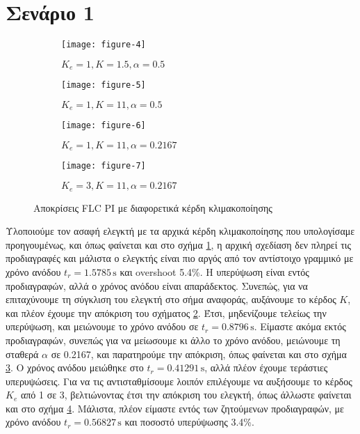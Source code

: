 \documentclass[11pt,a4paper,titlepage, oneside]{article}
\newlength\figureheight
\begin{document}
  	\section{Σενάριο 1}
	\begin{wrapfigure}{r}{0.5\textwidth}
		\setlength\figureheight{2.67cm}
		\vspace{-30pt}
		\centering
		\begin{subfigure}[t]{0.5\textwidth}
			\centering
			\texttt{[image: figure-4]}
			\caption{$K_e = 1, K = 1.5, \alpha = 0.5$}
			\label{fig:flcpi_responses_a}
		\end{subfigure}
		\begin{subfigure}[t]{0.5\textwidth}
			\centering
			\texttt{[image: figure-5]}
			\caption{$K_e = 1, K = 11, \alpha = 0.5$}
			\label{fig:flcpi_responses_b}
		\end{subfigure}
		\begin{subfigure}[t]{0.5\textwidth}
			\centering
			\texttt{[image: figure-6]}
			\caption{$K_e = 1, K = 11, \alpha = 0.2167$}
			\label{fig:flcpi_responses_c}
		\end{subfigure}
		\begin{subfigure}[t]{0.5\textwidth}
			\centering
			\texttt{[image: figure-7]}
			\caption{$K_e = 3, K = 11, \alpha = 0.2167$}
			\label{fig:flcpi_responses_d}
		\end{subfigure}
		\caption{Αποκρίσεις FLC PI με διαφορετικά κέρδη κλιμακοποίησης}
		\label{fig:flcpi_responses}
	\end{wrapfigure}
	Υλοποιούμε τον ασαφή ελεγκτή με τα αρχικά κέρδη κλιμακοποίησης που υπολογίσαμε προηγουμένως, και όπως φαίνεται και στο σχήμα \ref{fig:flcpi_responses_a}, η αρχική σχεδίαση δεν πληρεί τις προδιαγραφές και μάλιστα ο ελεγκτής είναι πιο αργός από τον αντίστοιχο γραμμικό με χρόνο ανόδου $t_r = 1.5785\,\mathrm{s}$ και overshoot 5.4\%. Η υπερύψωση είναι εντός προδιαγραφών, αλλά ο χρόνος ανόδου είναι απαράδεκτος. Συνεπώς, για να επιταχύνουμε τη σύγκλιση του ελεγκτή στο σήμα αναφοράς, αυξάνουμε το κέρδος $K$, και πλέον έχουμε την απόκριση του σχήματος \ref{fig:flcpi_responses_b}. Έτσι, μηδενίζουμε τελείως την υπερύψωση, και μειώνουμε το χρόνο ανόδου σε $t_r = 0.8796\, \mathrm{s}$. Είμαστε ακόμα εκτός προδιαγραφών, συνεπώς για να μείωσουμε κι άλλο το χρόνο ανόδου, μειώνουμε τη σταθερά $\alpha$ σε 0.2167, και παρατηρούμε την απόκριση, όπως φαίνεται και στο σχήμα \ref{fig:flcpi_responses_c}. Ο χρόνος ανόδου μειώθηκε στο $t_r = 0.41291\, \mathrm{s}$, αλλά πλέον έχουμε τεράστιες υπερυψώσεις. Για να τις αντισταθμίσουμε λοιπόν επιλέγουμε να αυξήσουμε το κέρδος $K_e$ από 1 σε 3, βελτιώνοντας έτσι την απόκριση του ελεγκτή, όπως άλλωστε φαίνεται και στο σχήμα \ref{fig:flcpi_responses_d}. Μάλιστα, πλέον είμαστε εντός των ζητούμενων προδιαγραφών, με χρόνο ανόδου $t_r = 0.56827\, \mathrm{s}$ και ποσοστό υπερύψωσης 3.4\%.\\
	
\end{document}
